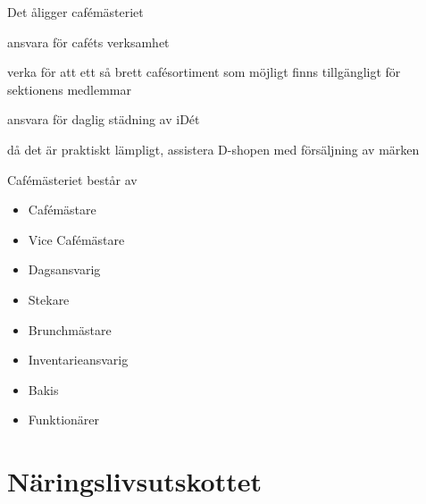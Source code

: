 \documentclass[pdfbookmarks,a4paper,11pt]{article}
\newlength{\itemcollength}
\newenvironment{reglemlista}{%
  \begin{list}{}{%
      \setlength{\labelwidth}{\itemcollength}%
      \setlength{\leftmargin}{\labelwidth + \labelsep}%
      \renewcommand{\makelabel}[1]{%
        \raisebox{0pt}[1ex][0pt]{%
          \makebox[\labelwidth][l]{%
            \parbox[t]{\itemcollength}{%
              \raggedright\hspace{0pt}##1}}}\hfill}%
      }}{%
  \end{list}}
\begin{document}
\begin{reglemlista}

	\item[Åligganden]
	Det åligger cafémästeriet
	\begin{attlista}
		\item ansvara för caféts verksamhet
		\item verka för att ett så brett cafésortiment som möjligt finns tillgängligt för sektionens medlemmar
		\item ansvara för daglig städning av iDét
		\item då det är praktiskt lämpligt, assistera D-shopen med försäljning av märken
	\end{attlista}

	\item[Sammansättning]
	Cafémästeriet består av
	\begin{itemize}
		\item Cafémästare
		\item Vice Cafémästare
		\item Dagsansvarig
		\item Stekare
        \item Brunchmästare
        \item Inventarieansvarig
        \item Bakis
		\item Funktionärer
	\end{itemize}

\end{reglemlista}

\section{Näringslivsutskottet}
\end{document}
